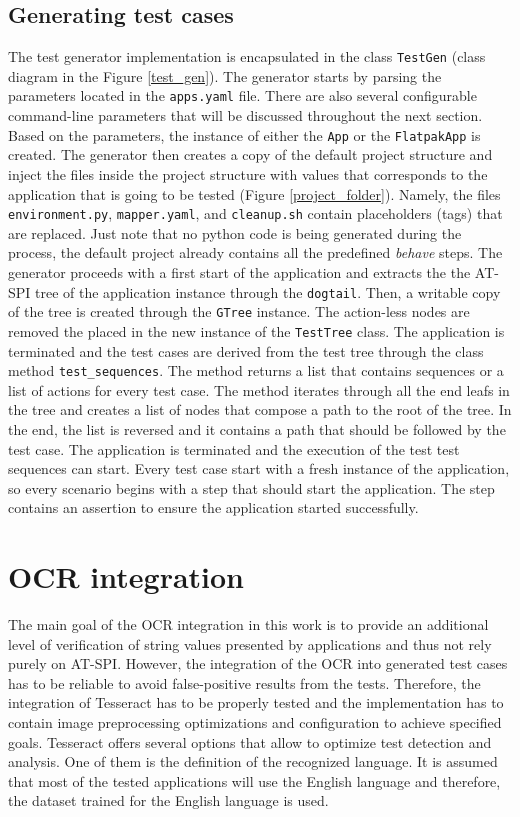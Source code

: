 \subsection{Generating test cases}
The test generator implementation is encapsulated in the class \texttt{TestGen} (class diagram in the Figure \ref{test_gen}). The generator starts by parsing the parameters located in the \texttt{apps.yaml} file. There are also several configurable command-line parameters that will be discussed throughout the next section. Based on the parameters, the instance of either the \texttt{App} or the \texttt{FlatpakApp} is created. The generator then creates a copy of the default project structure and inject the files inside the project structure with values that corresponds to the application that is going to be tested (Figure  \ref{project_folder}). Namely, the files \texttt{environment.py}, \texttt{mapper.yaml}, and \texttt{cleanup.sh} contain placeholders (tags) that are replaced. Just note that no python code is being generated during the process, the default project already contains all the predefined \textit{behave} steps. 
The generator proceeds with a first start of the application and extracts the the AT-SPI tree of the application instance through the \texttt{dogtail}. Then, a writable copy of the tree is created through the \texttt{GTree} instance. The action-less nodes are removed the placed in the new instance of the \texttt{TestTree} class. The application is terminated and the test cases are derived from the test tree through the class method \texttt{test\_sequences}. The method returns a list that contains sequences or a list of actions for every test case. The method iterates through all the end leafs in the tree and creates a list of nodes that compose a path to the root of the tree. In the end, the list is reversed and it contains a path that should be followed by the test case. The application is terminated and the execution of the test test sequences can start. 
Every test case start with a fresh instance of the application, so every scenario begins with a step that should start the application. The step contains an assertion to ensure the application started successfully.


\section{OCR integration}
The main goal of the OCR integration in this work is to provide an additional level of verification of string values presented by applications and thus not rely purely on AT-SPI. However, the integration of the OCR into generated test cases has to be reliable to avoid false-positive results from the tests. Therefore, the integration of Tesseract has to be properly tested and the implementation has to contain image preprocessing optimizations and configuration to achieve specified goals.
Tesseract offers several options that allow to optimize test detection and analysis. One of them is  the definition of the recognized language. It is assumed that most of the tested applications will use the English language and therefore, the dataset trained for the English language is used.

